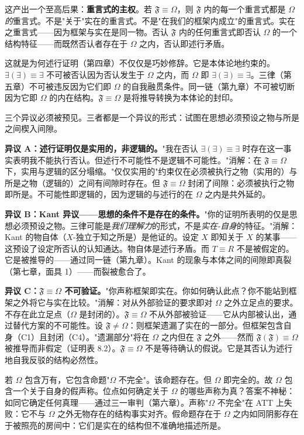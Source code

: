 \documentclass[10pt, openany, oneside]{book}
\begin{document}
这产出一个至高后果：\textbf{重言式的主权}。若 $\mathfrak{F} \equiv \Omega$，则 $\mathfrak{F}$ 内的每一个重言式都是 $\Omega$ \textit{的}重言式。不是"关于"实在的重言式。不是"在我们的框架内成立"的重言式。实在之重言式——因为框架与实在是同一物。否认 $\mathfrak{F}$ 内的任何重言式即否认 $\Omega$ 的一个结构特征——而既然否认者存在于 $\Omega$ 之内，否认即述行矛盾。

这就是为何述行证明（第四章）不仅仅是巧妙修辞。它是本体论地约束的。$\exists(\exists) \equiv \exists$ 不可被否认因为否认发生于 $\Omega$ 之内，而 $\Omega$ 即 $\exists(\exists) \equiv \exists$。三律（第五章）不可被违反因为它们即 $\Omega$ 的自我融贯条件。同一链（第九章）不可被切断因为它即 $\Omega$ 的内在结构。$\mathfrak{F} \equiv \Omega$ 是将推导转换为本体论的封印。

三个异议必须被预见。三者都是一个异议的形式：试图在思想必须预设之物与所是之间楔入间隙。

\textbf{异议 A：述行证明仅是实用的，非逻辑的。}"我在否认 $\exists(\exists) \equiv \exists$ 时存在这一事实表明我不能执行否认。但述行不可能性不是逻辑不可能性。"消解：在 $\mathfrak{F} \equiv \Omega$ 下，实用与逻辑的区分塌缩。"仅仅实用的"约束仅在必须被执行之物（实用的）与所是之物（逻辑的）之间有间隙时存在。但 $\mathfrak{F} \equiv \Omega$ 封闭了间隙：必须被执行之物即所是。不可能性即逻辑的，因为逻辑的与述行的在 $\Omega$ 之内是共外延的。

\textbf{异议 B：Kant 异议——思想的条件不是存在的条件。}"你的证明所表明的仅是思想必须预设之物。三律可能是\textit{我们理解力}的形式，不是\textit{实在-自身}的特征。"消解：Kant 的物自体（$X$-独立于知之所是）是他证的。设定 $X$ 即知关于 $X$ 的某事——这预设了设定所否认的认知通达。物自体是述行矛盾。而 $T \equiv R$ 不是被假定的。它是被推导的——通过同一链（第九章）。Kant 的现象与本体之间的间隙即真裂（第七章，面具 1）——而裂被愈合了。

\textbf{异议 C：$\mathfrak{F} \equiv \Omega$ 不可验证。}"你声称框架即实在。你如何确认此点？你不能站到框架之外将它与实在比较。"消解：对从外部验证的要求即对 $\Omega$ 之外立足点的要求。不存在此立足点（$\Omega$ 是封闭的）。$\mathfrak{F} \equiv \Omega$ 不从外部被验证——它从内部被认出，通过替代方案的不可能性。设 $\mathfrak{F} \neq \Omega$：则框架遗漏了实在的一部分。但框架包含自身（C1）且封闭（C4）。"遗漏部分"将在 $\Omega$ 之内但在 $\mathfrak{F}$ 之外——然而 $\mathfrak{F}(\mathfrak{F}) \equiv \Omega$ 被推导而非假定（证明表 8.2）。$\mathfrak{F} \equiv \Omega$ 不是等待确认的假说。它是其否认为述行地自我反驳的结构必然性。

若 $\Omega$ 包含万有，它包含命题"$\Omega$ 不完全"。该命题存在。但 $\Omega$ 即完全的。故 $\Omega$ 包含一个关于自身的假声称。位点如何确定关于 $\Omega$ 的哪些声称为真？答案不神秘：如同它确定任何真理——通过三一审判（第六章）。声称"$\Omega$ 不完全"在 ATT 上失败：它不与 $\Omega$ 之外无物存在的结构事实对齐。假命题存在于 $\Omega$ 之内如同阴影存在于被照亮的房间中：它们是实在的结构但不准确地描述所是。
\end{document}
